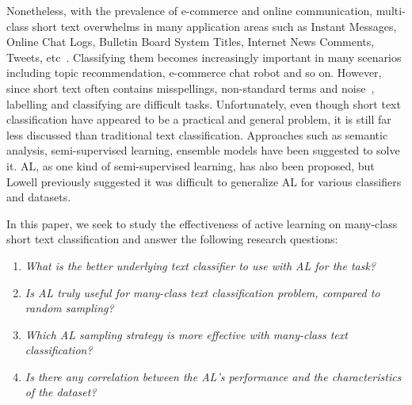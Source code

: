 Nonetheless, with the prevalence of e-commerce and online communication, multi-class short text overwhelms in many application areas such as Instant Messages, Online Chat Logs, Bulletin Board System Titles, Internet News Comments, Tweets, etc~\cite{song2014short}. Classifying them becomes increasingly important in many scenarios including
topic recommendation, e-commerce chat robot and so on. However, since short text often contains misspellings, non-standard terms and noise~\cite{yan2009dynamic}, labelling and classifying are difficult tasks. 
Unfortunately, even though short text classification have appeared to be a practical and general problem, it is still far less discussed than traditional text classification. Approaches such as semantic analysis, semi-supervised learning, ensemble models have been suggested to solve it. AL, as one kind of 
semi-supervised learning, has also been proposed, 
but Lowell\cite{lowell2019practical} previously suggested it was difficult to 
generalize AL for various classifiers and datasets.

In this paper, we seek to study the effectiveness of active learning on many-class short text classification and answer the following
research questions:

\begin{enumerate}[label=(\alph*)]
\item \textit{What is the better underlying text classifier to use with AL for the task?}
\item \textit{Is AL truly useful for many-class text classification problem,
compared to random sampling?}
\item \textit{Which AL sampling strategy is more effective with many-class text classification?}
\item \textit{Is there any correlation between the AL's performance and the
characteristics of the dataset?}
\end{enumerate}

